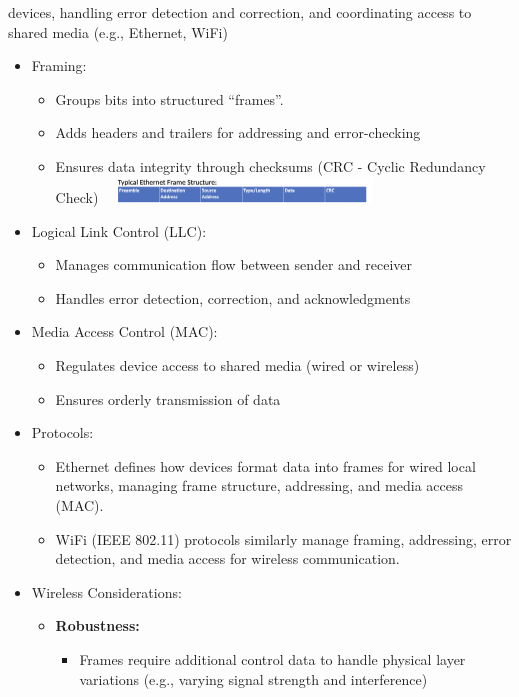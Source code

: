 \documentclass[10pt,landscape]{article}
\newcommand{\1}{\mathmybb{1}}
\begin{document}
\begin{multicols*}{3}
\begin{enumerate}
  devices, handling error detection and correction, and coordinating access to shared media (e.g., Ethernet, WiFi)
  \begin{itemize}
    \item Framing:
    \begin{itemize}
      \item Groups bits into structured “frames”.
      \item Adds headers and trailers for addressing and error-checking
      \item Ensures data integrity through checksums (CRC - Cyclic Redundancy Check)
      \includegraphics*[width=7.5cm, height=0.7cm]{images/ethernetframe.png}
    \end{itemize}
    \item Logical Link Control (LLC):
    \begin{itemize}
      \item Manages communication flow between sender and receiver
      \item Handles error detection, correction, and acknowledgments
    \end{itemize}
    \item Media Access Control (MAC):
    \begin{itemize}
      \item Regulates device access to shared media (wired or wireless)
      \item Ensures orderly transmission of data
    \end{itemize}
    \item Protocols:
    \begin{itemize}
      \item Ethernet defines how devices format data into frames for wired local networks, managing frame structure,
      addressing, and media access (MAC).
      \item WiFi (IEEE 802.11) protocols similarly manage framing, addressing, error detection, and media access for
      wireless communication. 
    \end{itemize}
    \item Wireless Considerations:
      \begin{itemize}
        \item \textbf{Robustness:}
          \begin{itemize}
            \item Frames require additional control data to handle physical layer variations (e.g., varying signal strength and interference)

\end{itemize}
\end{itemize}
\end{itemize}
\end{enumerate}
\end{multicols*}
\end{document}
